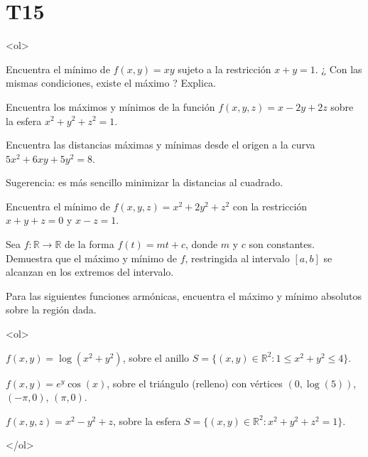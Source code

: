 \documentclass{article}
\theoremstyle{definition}
\begin{document}
  \section*{T15 }

  
  
	<ol>


          
        \item Encuentra el mínimo de $f(x,y)=xy$ sujeto a la
          restricción $x+y=1$. ¿ Con las
          mismas condiciones, existe el máximo ? Explica.
          
        \item Encuentra los máximos y mínimos de la función
          $f(x,y,z)=x-2y+2z$ sobre la esfera $x^2+y^2+z^2=1$.

          
        \item Encuentra las distancias máximas y mínimas 
          desde el origen a la curva $5x^2+6xy+5y^2=8$.

          Sugerencia: es más sencillo minimizar la distancias al cuadrado.


    
        \item Encuentra el mínimo de $f(x,y,z)=x^2+2y^2+z^2$ con
          la restricción $x+y+z=0$ y $x-z=1$.

		
		\item Sea $f:\mathbb{R}\to \mathbb{R}$ de la forma $f(t)=mt+c$, donde
		$m$ y $c$ son constantes. Demuestra que el máximo y mínimo de
		$f$, restringida al intervalo $[a,b]$ se alcanzan en los extremos del intervalo.
          
        \item Para las siguientes funciones armónicas, encuentra
          el máximo y mínimo absolutos sobre la región dada.

          <ol>
         
          \item $f(x,y)=\log(x^2+y^2)$, sobre el anillo
            $S=\{(x,y)\in \mathbb{R}^2:  1\leq  x^2+y^2\leq 4\}$.
          \item $f(x,y)=e^y\cos(x)$, sobre el triángulo (relleno)
            con vértices $(0,\log(5))$, $(-\pi,0)$, $(\pi,0)$.

             \item $f(x,y,z)=x^2-y^2+z$, sobre la esfera
            $S=\{(x,y)\in \mathbb{R}^2: x^2+y^2+z^2=1\}$.
            
          </ol>
          
\end{document}
